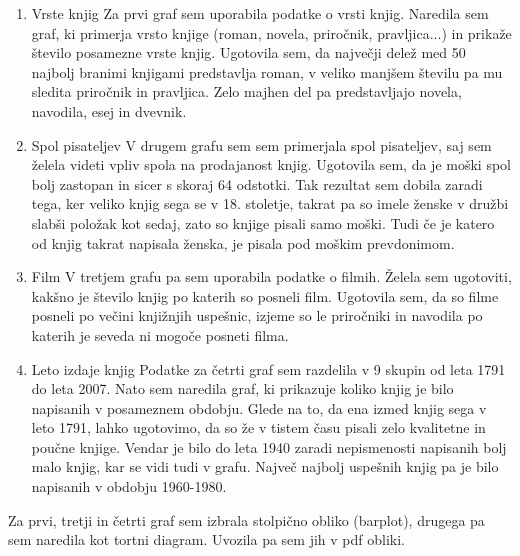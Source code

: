 \documentclass[11pt,a4paper]{article}
\begin{document}
\begin{enumerate}
\item{Vrste knjig}
\newline
Za prvi graf sem uporabila podatke o vrsti knjig. Naredila sem graf, ki primerja vrsto knjige (roman, novela, priročnik, pravljica...) in prikaže število posamezne vrste knjig. Ugotovila sem, da največji delež med 50 najbolj branimi knjigami predstavlja roman, v veliko manjšem številu pa mu sledita priročnik in pravljica. Zelo majhen del pa predstavljajo novela, navodila, esej in dvevnik.


\item{Spol pisateljev}
\newline
V drugem grafu sem sem primerjala spol pisateljev, saj sem želela videti vpliv spola na prodajanost knjig. Ugotovila sem, da je moški spol bolj zastopan in sicer s skoraj 64 odstotki. Tak rezultat sem dobila zaradi tega, ker veliko knjig sega se v 18. stoletje, takrat pa so imele ženske v družbi slabši položak kot sedaj, zato so knjige pisali samo moški. Tudi če je katero od knjig takrat napisala ženska, je pisala pod moškim prevdonimom. 


\item{Film}
\newline
V tretjem grafu pa sem uporabila podatke o filmih. Želela sem ugotoviti, kakšno je število knjig po katerih so posneli film. Ugotovila sem, da so filme posneli po večini knjižnjih uspešnic, izjeme so le priročniki in navodila po katerih je seveda ni mogoče posneti filma.  


\item{Leto izdaje knjig}
\newline
Podatke za četrti graf sem razdelila v 9 skupin od leta 1791 do leta 2007. Nato sem naredila graf, ki prikazuje koliko knjig je bilo napisanih v posameznem obdobju. Glede na to, da ena izmed knjig sega v leto 1791, lahko ugotovimo, da so že v tistem času pisali zelo kvalitetne in poučne knjige. Vendar je bilo do leta 1940 zaradi nepismenosti napisanih bolj malo knjig, kar se vidi tudi v grafu. Največ najbolj uspešnih knjig pa je bilo napisanih v obdobju 1960-1980.


\end{enumerate}








Za prvi, tretji in četrti graf sem izbrala stolpično obliko (barplot), drugega pa sem naredila kot tortni diagram. Uvozila pa sem jih v pdf obliki. 
\end{document}
